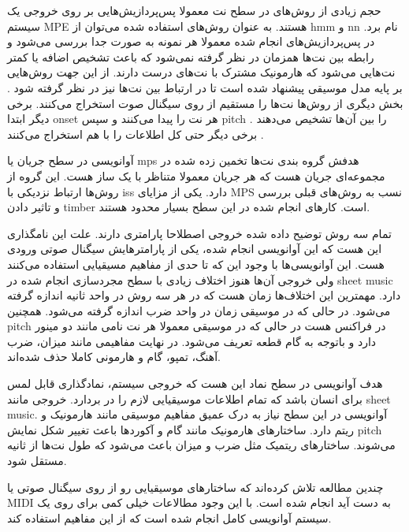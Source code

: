 حجم زیادی از روش‌های در سطح نت معمولا پس‌پردازیش‌هایی بر روی خروجی یک سیستم
\gls{MPE} هستند. به عنوان روش‌های استفاده شده می‌توان از \gls{hmm}
\cite{nam2011classification} و \gls{nn} \cite{boulanger2012modeling} نام برد. در
پس‌پردازیش‌های انجام شده معمولا هر نمونه به صورت جدا بررسی می‌شود و رابطه بین
نت‌ها همزمان در نظر گرفته نمی‌شود که باعث تشخیص اضافه یا کمتر نت‌هایی می‌شود که
هارمونیک مشترک با نت‌های درست دارند. از این جهت روش‌هایی بر پایه مدل موسیقی
پیشنهاد شده است تا در ارتباط بین نت‌ها نیز در نظر گرفته شود
\cite{boulanger2012modeling, sigtia2016end}. بخش دیگری از روش‌ها نت‌ها را مستقیم
از روی سیگنال صوت استخراج می‌کنند. برخی دیگر ابتدا onset هر نت را پیدا می‌کنند و
سپس \gls{pitch} را بین آن‌ها تشخیص می‌دهند \cite{marolt2004connectionist}. برخی
دیگر حتی کل اطلاعات را با هم استخراج می‌کنند
\cite{cogliati2016context,ewert2016piano,hawthorne2017onsets}.

آوانویسی در سطح جریان یا \gls{mps} هدفش گروه بندی نت‌ها تخمین زده شده در
مجموعه‌ای جریان هست که هر جریان معمولا متناظر با یک ساز هست. این گروه از روش‌ها
ارتباط نزدیکی با \gls{iss} دارد. یکی از مزایای \gls{MPS} نسب به روش‌های قبلی
بررسی و تاثیر دادن \gls{timber} است. کارهای انجام شده در این سطح بسیار محدود
هستند.

تمام سه روش توضیح داده شده خروجی اصطلاحا پارامتری دارند. علت این نامگذاری این
هست که این آوانویسی انجام شده، یکی از پارامترهایش سیگنال صوتی ورودی هست. این
آوانویسی‌ها با وجود این که تا حدی از مفاهیم مسیقیایی استفاده می‌کنند ولی خروجی
آن‌ها هنوز اختلاف زیادی با سطح مجردسازی انجام شده در \gls{sheet music} دارد.
مهمترین این اختلاف‌ها زمان هست که در هر سه روش در واحد ثانیه اندازه گرفته
می‌شود. در حالی که در موسیقی زمان در واحد ضرب اندازه گرفته می‌شود. همچنین
\gls{pitch} در فراکنس هست در حالی که در موسیقی معمولا هر نت نامی مانند دو مینور
دارد و باتوجه به گام قطعه تعریف می‌شود. در نهایت مفاهیمی مانند میزان، ضرب آهنگ،
تمپو، گام و هارمونی کاملا حذف شده‌اند.

هدف آوانویسی در سطح نماد این هست که خروجی سیستم، نمادگذاری قابل لمس برای انسان
باشد که تمام اطلاعات موسیقیایی لازم را در بردارد. خروجی مانند \gls{sheet music}.
آوانویسی در این سطح نیاز به درک عمیق مفاهیم موسیقی مانند هارمونیک و ریتم دارد.
ساختارهای هارمونیک مانند گام و آکوردها باعث تغییر شکل نمایش \gls{pitch} می‌شوند.
ساختارهای ریتمیک مثل ضرب و میزان باعث می‌شود که طول نت‌ها از ثانیه مستقل شود.

چندین مطالعه تلاش کرده‌اند که ساختارهای موسیقیایی رو از روی سیگنال صوتی یا
\gls{MIDI} به دست آید انجام شده است. با این وجود مطالاعات خیلی کمی برای روی یک
سیستم آوانویسی کامل انجام شده است که از این مفاهیم استفاده کند.


